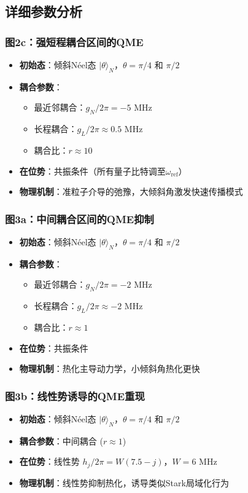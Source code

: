 \documentclass[11pt,a4paper]{article}
\begin{document}
\subsection{详细参数分析}

\subsubsection{图2c：强短程耦合区间的QME}
\begin{itemize}
    \item \textbf{初始态}：倾斜Néel态 $|\theta\rangle_N$，$\theta = \pi/4$ 和 $\pi/2$
    \item \textbf{耦合参数}：
    \begin{itemize}
        \item 最近邻耦合：$g_N/2\pi = -5$ MHz
        \item 长程耦合：$g_L/2\pi \approx 0.5$ MHz
        \item 耦合比：$r \approx 10$
    \end{itemize}
    \item \textbf{在位势}：共振条件（所有量子比特调至$\omega_{\text{ref}}$）
    \item \textbf{物理机制}：准粒子介导的弛豫，大倾斜角激发快速传播模式
\end{itemize}

\subsubsection{图3a：中间耦合区间的QME抑制}
\begin{itemize}
    \item \textbf{初始态}：倾斜Néel态 $|\theta\rangle_N$，$\theta = \pi/4$ 和 $\pi/2$
    \item \textbf{耦合参数}：
    \begin{itemize}
        \item 最近邻耦合：$g_N/2\pi = -2$ MHz
        \item 长程耦合：$g_L/2\pi \approx -2$ MHz
        \item 耦合比：$r \approx 1$
    \end{itemize}
    \item \textbf{在位势}：共振条件
    \item \textbf{物理机制}：热化主导动力学，小倾斜角热化更快
\end{itemize}

\subsubsection{图3b：线性势诱导的QME重现}
\begin{itemize}
    \item \textbf{初始态}：倾斜Néel态 $|\theta\rangle_N$，$\theta = \pi/4$ 和 $\pi/2$
    \item \textbf{耦合参数}：中间耦合 ($r \approx 1$)
    \item \textbf{在位势}：线性势 $h_j/2\pi = W(7.5 - j)$，$W = 6$ MHz
    \item \textbf{物理机制}：线性势抑制热化，诱导类似Stark局域化行为
\end{itemize}
\end{document}
